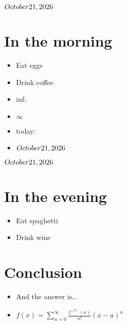 \(\today\)

\section{In the morning}\label{in-the-morning}

\begin{itemize}
\tightlist
\item
  Eat eggs
\item
  Drink coffee
\item
  inf:
\item
  \(\infty\)
\item
  today:
\item
  \(\today\)
\end{itemize}

\(\today\)

\section{In the evening}\label{in-the-evening}

\begin{itemize}
\tightlist
\item
  Eat spaghetti
\item
  Drink wine
\end{itemize}

\section{Conclusion}\label{conclusion}

\begin{itemize}
\tightlist
\item
  And the answer is\ldots{}
\item
  \(f(x)=\sum_{n=0}^\infty\frac{f^{(n)}(a)}{n!}(x-a)^n\)
\end{itemize}
